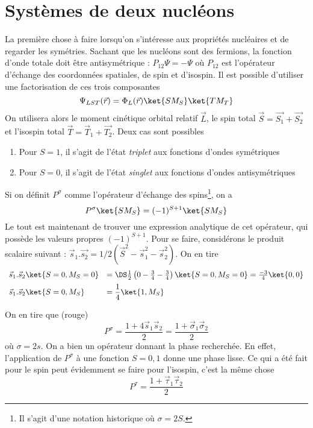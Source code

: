 	
	
	
\section{Systèmes de deux nucléons}
La première chose à faire lorsqu'on s'intéresse aux propriétés nucléaires et de regarder les symétries. Sachant
que les nucléons sont des fermions, la fonction d'onde totale doit être antisymétrique : $P_{12}\Psi = -\Psi$
où $P_{12}$ est l'opérateur d'échange des coordonnées spatiales, de spin et d'isospin. Il est possible 
d'utiliser une factorisation de ces trois composantes
\begin{equation}
\Psi_{LST}(\vec{r}) = \Phi_L(\vec{r})\ket{SM_S}\ket{TM_T}
\end{equation}
On utilisera alors le moment cinétique orbital relatif $\vec{L}$, le spin total $\vec{S}=\vec{S_1}+\vec{S_2}$ 
et l'isospin total $\vec T = \vec T_1+\vec{T_2}$. Deux cas sont possibles
\begin{enumerate}
\item Pour $S=1$, il s'agit de l'état \textit{triplet} aux fonctions d'ondes symétriques
\item Pour $S=0$, il s'agit de l'état \textit{singlet} aux fonctions d'ondes antisymétriques
\end{enumerate}
Si on définit $P^\sigma$ comme l'opérateur d'échange des spins\footnote{Il s'agit d'une notation historique 
où $\sigma=2S$.}, on a
\begin{equation}
P^\sigma\ket{SM_S} = (-1)^{S+1}\ket{SM_S}
\end{equation}
Le tout est maintenant de trouver une expression analytique de cet opérateur, qui possède les valeurs propres
$(-1)^{S+1}$. Pour se faire, considérons le produit scalaire suivant : $\vec s_1.\vec{s_2} = 1/2(
\vec{S}^2-\vec s_1^2-\vec s_2^2)$. On en tire
\begin{equation}
\begin{array}{ll}
\vec s_1.\vec s_2\ket{S=0, M_S=0} &=\DS \frac{1}{2}\left(0-\frac{3}{4}-\frac{3}{4}\right)\ket{S=0,M_S=0} = 
\frac{-3}{4}\ket{0,0}\vspace{2mm}\\
\vec s_1.\vec s_2\ket{S=0, M_S} &=\dfrac{1}{4}\ket{1,M_S}
\end{array}
\end{equation}
	
On en tire que (rouge)
\begin{equation}
P^\sigma = \frac{1+4\vec s_1\vec s_2}{2} = \frac{1+\vec\sigma_1\vec\sigma_2}{2}
\end{equation}		
où $\sigma = 2s$. On a bien un opérateur donnant la phase recherchée. En effet, l'application de $P^\sigma$ à 
une fonction $S=0,1$ donne une phase lisse. Ce qui a été fait pour le spin peut évidemment se faire pour l'isospin,
c'est la même chose
\begin{equation}
P^\tau = \dfrac{1+\vec\tau_1\vec\tau_2}{2}
\end{equation}

